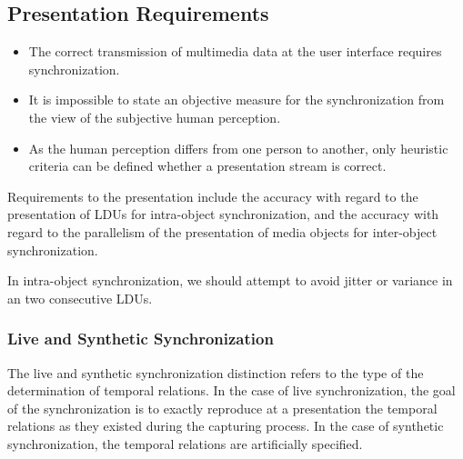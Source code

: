 \subsection{Presentation Requirements}

\begin{multicols}{2}
	\begin{itemize}
		\item The correct transmission of multimedia data at the user interface requires synchronization. 
		\item It is impossible to state an objective measure for the synchronization from the view of the subjective human perception.
		\item As the human perception differs from one person to another, only heuristic criteria can be defined whether a presentation stream is correct.
	\end{itemize}
\end{multicols}
	
Requirements to the presentation include the accuracy with regard to the presentation of LDUs for intra-object synchronization, and the accuracy with regard to the parallelism of the presentation of media objects for inter-object synchronization. 

In intra-object synchronization, we should attempt to avoid jitter or variance in an two consecutive LDUs.

\subsubsection*{Live and Synthetic Synchronization}
The live and synthetic synchronization distinction refers to the type of the determination of temporal relations. In the case of live synchronization, the goal of the
synchronization is to exactly reproduce at a presentation the temporal relations as they existed during the capturing process. In the case of synthetic synchronization,
the temporal relations are artificially specified.

